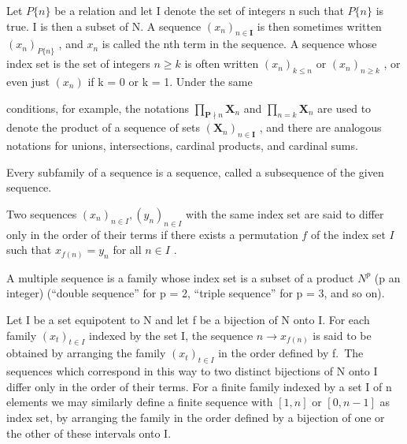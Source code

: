 Let \(P\{n\}\) be a relation and let I denote the set of integers n such that \(P\{n\}\) is true. I is then a subset of N. A sequence \((x_n)_{n \in \mathbf{I}}\) is then sometimes written \((x_n)_{P\{n\}}\) , and \(x_n\) is called the nth term in the sequence. A sequence whose index set is the set of integers \(n \geqslant k\) is often written \((x_n)_{k \leqslant n}\) or \((x_n)_{n \geqslant k}\) , or even just \((x_n)\) if k = 0 or k = 1. Under the same

conditions, for example, the notations \(\prod_{\mathbf{P}\nmid n}\mathbf{X}_n\) and \(\prod_{n = k}\mathbf{X}_n\) are used to denote the product of a sequence of sets \((\mathbf{X}_n)_{n\in \mathbf{I}}\) , and there are analogous notations for unions, intersections, cardinal products, and cardinal sums.

Every subfamily of a sequence is a sequence, called a subsequence of the given sequence.

Two sequences \((x_{n})_{n\in I}, (y_{n})_{n\in I}\) with the same index set are said to differ only in the order of their terms if there exists a permutation \(f\) of the index set \(I\) such that \(x_{f(n)} = y_{n}\) for all \(n\in I\) .

A multiple sequence is a family whose index set is a subset of a product \(N^{p}\) (p an integer) (``double sequence'' for p = 2, ``triple sequence'' for p = 3, and so on).

Let I be a set equipotent to N and let f be a bijection of N onto I. For each family \((x_{t})_{t\in I}\) indexed by the set I, the sequence \(n\to x_{f(n)}\) is said to be obtained by arranging the family \((x_{t})_{t\in I}\) in the order defined by f.~The sequences which correspond in this way to two distinct bijections of N onto I differ only in the order of their terms. For a finite family indexed by a set I of n elements we may similarly define a finite sequence with \([1,n]\) or \([0,n-1]\) as index set, by arranging the family in the order defined by a bijection of one or the other of these intervals onto I.

